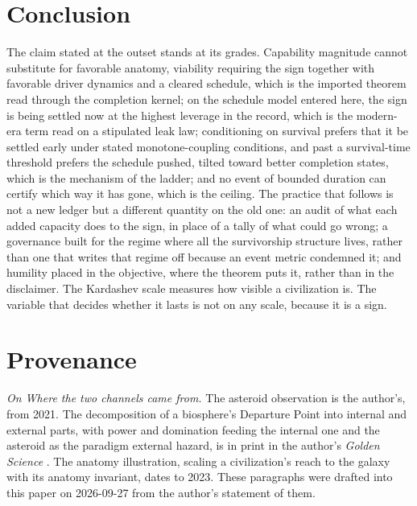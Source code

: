 \section{Conclusion}\label{sec:conclusion}

The claim stated at the outset stands at its grades. Capability
magnitude cannot substitute for favorable anatomy, viability requiring
the sign together with favorable driver dynamics and a cleared
schedule, which is the imported theorem read through the completion
kernel; on the schedule model entered here, the sign is being settled
now at the highest leverage in the record, which is the modern-era term
read on a stipulated leak law; conditioning on survival prefers that it
be settled early under stated monotone-coupling conditions, and past a
survival-time threshold prefers the schedule pushed, tilted toward
better completion states, which is the mechanism of the ladder; and no event of bounded
duration can certify which way it has gone, which is the ceiling. The
practice that follows is not a new ledger but a different quantity on
the old one: an audit of what each added capacity does to the sign, in
place of a tally of what could go wrong; a governance built for the
regime where all the survivorship structure lives, rather than one that
writes that regime off because an event metric condemned it; and
humility placed in the objective, where the theorem puts it, rather than
in the disclaimer. The Kardashev scale measures how visible a
civilization is. The variable that decides whether it lasts is not on
any scale, because it is a sign.


\section*{Provenance}

\noindent\textit{On Where the two channels came from.} The asteroid observation is the author's, from 2021. The decomposition of a biosphere's Departure Point into internal and external parts, with power and domination feeding the internal one and the asteroid as the paradigm external hazard, is in print in the author's \emph{Golden Science} \cite{GoldenScience2022}. The anatomy illustration, scaling a civilization's reach to the galaxy with its anatomy invariant, dates to 2023. These paragraphs were drafted into this paper on 2026-09-27 from the author's statement of them.

\printbibliography
